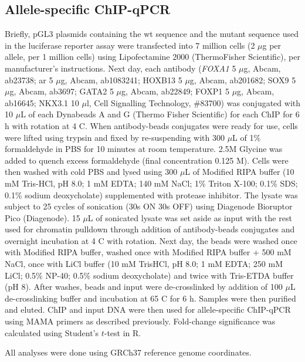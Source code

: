 \subsection{Allele-specific ChIP-qPCR}

Briefly, pGL3 plasmids containing the \gls{wt} sequence and the mutant sequence used in the luciferase reporter assay were transfected into 7 million cells (2 $\mu$g per allele, per 1 million cells) using Lipofectamine 2000 (ThermoFisher Scientific), per manufacturer's instructions.
Next day, each antibody (\emph{FOXA1} 5 $\mu$g, Abcam, ab23738; \gls{ar} 5 $\mu$g, Abcam, ab1083241; HOXB13 5 $\mu$g, Abcam, ab201682; SOX9 5 $\mu$g, Abcam, ab3697; GATA2 5 $\mu$g, Abcam, ab22849; FOXP1 5 $\mu$g, Abcam, ab16645; NKX3.1 10 $\mu$l, Cell Signalling Technology, \#83700) was conjugated with 10 $\mu$L of each Dynabeads A and G (Thermo Fisher Scientific) for each ChIP for 6 h with rotation at 4 \textdegree C.
When antibody-beads conjugates were ready for use, cells were lifted using trypsin and fixed by re-suspending with 300 $\mu$L of 1\% formaldehyde in PBS for 10 minutes at room temperature.
2.5M Glycine was added to quench excess formaldehyde (final concentration 0.125 M).
Cells were then washed with cold PBS and lysed using 300 $\mu$L of Modified RIPA buffer (10 mM Tris-HCl, pH 8.0; 1 mM EDTA; 140 mM NaCl; 1\% Triton X-100; 0.1\% SDS; 0.1\% sodium deoxycholate) supplemented with protease inhibitor.
The lysate was subject to 25 cycles of sonication (30s ON 30s OFF) using Diagenode Bioruptor Pico (Diagenode).
15 $\mu$L of sonicated lysate was set aside as input with the rest used for chromatin pulldown through addition of antibody-beads conjugates and overnight incubation at 4 \textdegree C with rotation.
Next day, the beads were washed once with Modified RIPA buffer, washed once with Modified RIPA buffer + 500 mM NaCl, once with LiCl buffer (10 mM TrisHCl, pH 8.0; 1 mM EDTA; 250 mM LiCl; 0.5\% NP-40; 0.5\% sodium deoxycholate) and twice with Tris-ETDA buffer (pH 8).
After washes, beads and input were de-crosslinked by addition of 100 $\mu$L de-crosslinking buffer and incubation at 65 \textdegree C for 6 h.
Samples were then purified and eluted.
ChIP and input DNA were then used for allele-specific ChIP-qPCR using MAMA primers as described previously.
Fold-change significance was calculated using Student's $t$-test in R.

All analyses were done using GRCh37 \cite{internationalhumangenomesequencingconsortiumFinishingEuchromaticSequence2004} reference genome coordinates.
